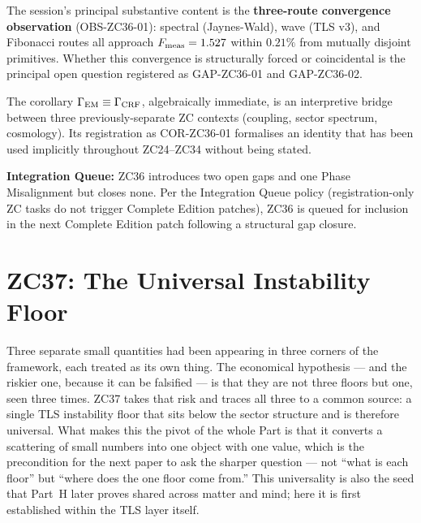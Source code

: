 \documentclass[12pt, a4paper]{article}
\begin{document}
\medskip
The session's principal substantive content is the
\textbf{three-route convergence observation} (OBS-ZC36-01):
spectral (Jaynes-Wald), wave (TLS v3), and Fibonacci routes
all approach $F_{\rm meas} = 1.527$ within $0.21\%$ from
mutually disjoint primitives. Whether this convergence is
structurally forced or coincidental is the principal open
question registered as GAP-ZC36-01 and GAP-ZC36-02.

\medskip
The corollary $\Gamma_{\rm EM} \equiv \Gamma_{\rm CRF}$,
algebraically immediate, is an interpretive bridge between
three previously-separate ZC contexts (coupling, sector
spectrum, cosmology). Its registration as COR-ZC36-01
formalises an identity that has been used implicitly
throughout ZC24--ZC34 without being stated.

\medskip
\noindent\textbf{Integration Queue:} ZC36 introduces two open
gaps and one Phase Misalignment but closes none. Per the
Integration Queue policy (registration-only ZC tasks do not
trigger Complete Edition patches), ZC36 is queued for inclusion
in the next Complete Edition patch following a structural
gap closure.

\section{ZC37: The Universal Instability Floor}
\label{sec:zc37-epsilon-floor}

Three separate small quantities had been appearing in three corners of the
framework, each treated as its own thing. The economical hypothesis --- and the
riskier one, because it can be falsified --- is that they are not three floors
but one, seen three times. ZC37 takes that risk and traces all three to a common
source: a single TLS instability floor that sits below the sector structure and
is therefore universal. What makes this the pivot of the whole Part is that it
converts a scattering of small numbers into one object with one value, which is
the precondition for the next paper to ask the sharper question --- not ``what is
each floor'' but ``where does the one floor come from.'' This universality is
also the seed that Part~H later proves shared across matter and mind; here it is
first established within the TLS layer itself.
\end{document}
